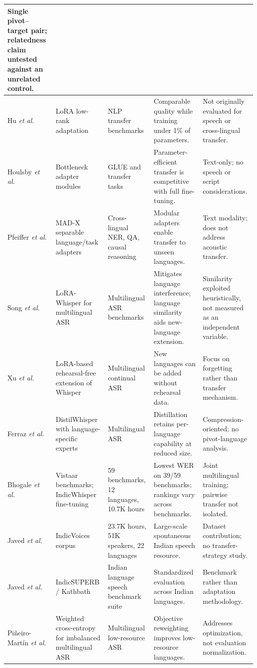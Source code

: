 \documentclass[conference]{IEEEtran}
\begin{document}
\begin{table}[!t]
\begin{tabular}{|p{2.4cm}|p{3.1cm}|p{3.0cm}|p{3.6cm}|p{3.6cm}|}
Single pivot--target pair; relatedness claim untested against an unrelated control. \\
\hline
Hu \emph{et al.} \cite{hu2022lora} &
LoRA low-rank adaptation &
NLP transfer benchmarks &
Comparable quality while training under 1\% of parameters. &
Not originally evaluated for speech or cross-lingual transfer. \\
\hline
Houlsby \emph{et al.} \cite{houlsby2019adapters} &
Bottleneck adapter modules &
GLUE and transfer tasks &
Parameter-efficient transfer is competitive with full fine-tuning. &
Text-only; no speech or script considerations. \\
\hline
Pfeiffer \emph{et al.} \cite{pfeiffer2020madx} &
MAD-X separable language/task adapters &
Cross-lingual NER, QA, causal reasoning &
Modular adapters enable transfer to unseen languages. &
Text modality; does not address acoustic transfer. \\
\hline
Song \emph{et al.} \cite{song2024lorawhisper} &
LoRA-Whisper for multilingual ASR &
Multilingual ASR benchmarks &
Mitigates language interference; language similarity aids new-language extension. &
Similarity exploited heuristically, not measured as an independent variable. \\
\hline
Xu \emph{et al.} \cite{xu2024rehearsalfree} &
LoRA-based rehearsal-free extension of Whisper &
Multilingual continual ASR &
New languages can be added without rehearsal data. &
Focus on forgetting rather than transfer mechanism. \\
\hline
Ferraz \emph{et al.} \cite{ferraz2024distilwhisper} &
DistilWhisper with language-specific experts &
Multilingual ASR &
Distillation retains per-language capability at reduced size. &
Compression-oriented; no pivot-language analysis. \\
\hline
Bhogale \emph{et al.} \cite{bhogale2023vistaar} &
Vistaar benchmarks; IndicWhisper fine-tuning &
59 benchmarks, 12 languages, 10.7K hours &
Lowest WER on 39/59 benchmarks; rankings vary across benchmarks. &
Joint multilingual training; pairwise transfer not isolated. \\
\hline
Javed \emph{et al.} \cite{javed2024indicvoices} &
IndicVoices corpus &
23.7K hours, 51K speakers, 22 languages &
Large-scale spontaneous Indian speech resource. &
Dataset contribution; no transfer-strategy study. \\
\hline
Javed \emph{et al.} \cite{javed2023indicsuperb} &
IndicSUPERB / Kathbath &
Indian language speech benchmark suite &
Standardized evaluation across Indian languages. &
Benchmark rather than adaptation methodology. \\
\hline
Pi\~{n}eiro-Mart\'{i}n \emph{et al.} \cite{pineiro2024weighted} &
Weighted cross-entropy for imbalanced multilingual ASR &
Multilingual low-resource ASR &
Objective reweighting improves low-resource languages. &
Addresses optimization, not evaluation normalization. \\
\hline
\end{tabular}
\end{table}
\end{document}
